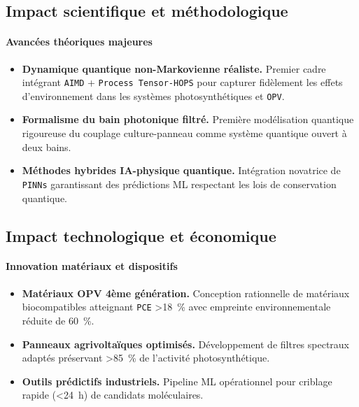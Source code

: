 \documentclass[12pt, a4paper]{article}
\begin{document}
\subsection{Impact scientifique et méthodologique}

\paragraph{Avancées théoriques majeures}
\begin{itemize}
    \item \textbf{Dynamique quantique non-Markovienne réaliste.} Premier cadre intégrant \texttt{AIMD} + \texttt{Process Tensor-HOPS} pour capturer fidèlement les effets d'environnement dans les systèmes photosynthétiques et \texttt{OPV}.
    
    \item \textbf{Formalisme du bain photonique filtré.} Première modélisation quantique rigoureuse du couplage culture-panneau comme système quantique ouvert à deux bains.
    
    \item \textbf{Méthodes hybrides IA-physique quantique.} Intégration novatrice de \texttt{PINNs} garantissant des prédictions ML respectant les lois de conservation quantique.
\end{itemize}

\subsection{Impact technologique et économique}

\paragraph{Innovation matériaux et dispositifs}
\begin{itemize}
    \item \textbf{Matériaux OPV 4ème génération.} Conception rationnelle de matériaux biocompatibles atteignant \texttt{PCE} \SI{>18}{\percent} avec empreinte environnementale réduite de \SI{60}{\percent}.
    
    \item \textbf{Panneaux agrivoltaïques optimisés.} Développement de filtres spectraux adaptés préservant \SI{>85}{\percent} de l'activité photosynthétique.
    
    \item \textbf{Outils prédictifs industriels.} Pipeline ML opérationnel pour criblage rapide (\SI{<24}{\hour}) de candidats moléculaires.
\end{itemize}
\end{document}
